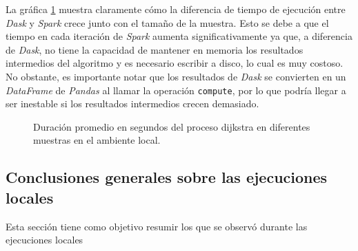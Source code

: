 La gráfica \ref{lineas:local-dijkstra} muestra claramente cómo la diferencia de tiempo de ejecución entre \textit{Dask} y \textit{Spark} crece junto con el tamaño de la muestra. Esto se debe a que el tiempo en cada iteración de \textit{Spark} aumenta significativamente ya que, a diferencia de \textit{Dask}, no tiene la capacidad de mantener en memoria los resultados intermedios del algoritmo y es necesario escribir a disco, lo cual es muy costoso. No obstante, es importante notar que los resultados de \textit{Dask} se convierten en un \textit{DataFrame} de \textit{Pandas} al llamar la operación \texttt{compute}, por lo que podría llegar a ser inestable si los resultados intermedios crecen demasiado.

\begin{figure}
\centering
{}
\caption{Duración promedio en segundos del proceso dijkstra en diferentes muestras en el ambiente local.}
\label{lineas:local-dijkstra}
\end{figure}

\subsection{Conclusiones generales sobre las ejecuciones locales}

Esta sección tiene como objetivo resumir los que se observó durante las ejecuciones locales 

